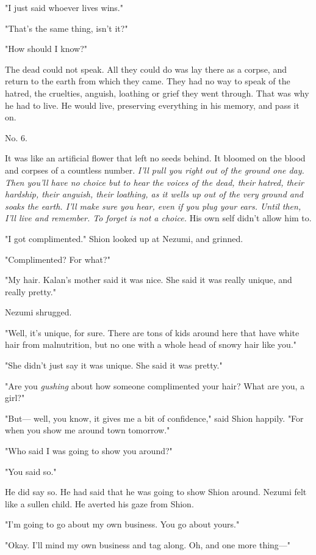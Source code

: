 "I just said whoever lives wins."

"That's the same thing, isn't it?"

"How should I know?"

The dead could not speak. All they could do was lay there as a corpse,
and return to the earth from which they came. They had no way to speak
of the hatred, the cruelties, anguish, loathing or grief they went
through. That was why he had to live. He would live, preserving
everything in his memory, and pass it on.

No. 6.

It was like an artificial flower that left no seeds behind. It bloomed
on the blood and corpses of a countless number. \emph{I'll pull you right out
of the ground one day. Then you'll have no choice but to hear the voices
of the dead, their hatred, their hardship, their anguish, their
loathing, as it wells up out of the very ground and soaks the earth.
I'll make sure you hear, even if you plug your ears. Until then, I'll
live and remember. To forget is not a choice.} His own self didn't allow
him to.

"I got complimented." Shion looked up at Nezumi, and grinned.

"Complimented? For what?"

"My hair. Kalan's mother said it was nice. She said it was really
unique, and really pretty."

Nezumi shrugged.

"Well, it's unique, for sure. There are tons of kids around here that
have white hair from malnutrition, but no one with a whole head of snowy
hair like you."

"She didn't just say it was unique. She said it was pretty."

"Are you \emph{gushing} about how someone complimented your hair? What are you,
a girl?"

"But--- well, you know, it gives me a bit of confidence," said Shion
happily. "For when you show me around town tomorrow."

"Who said I was going to show you around?"

"You said so."

He did say so. He had said that he was going to show Shion around.
Nezumi felt like a sullen child. He averted his gaze from Shion.

"I'm going to go about my own business. You go about yours."

"Okay. I'll mind my own business and tag along. Oh, and one more thing---"

